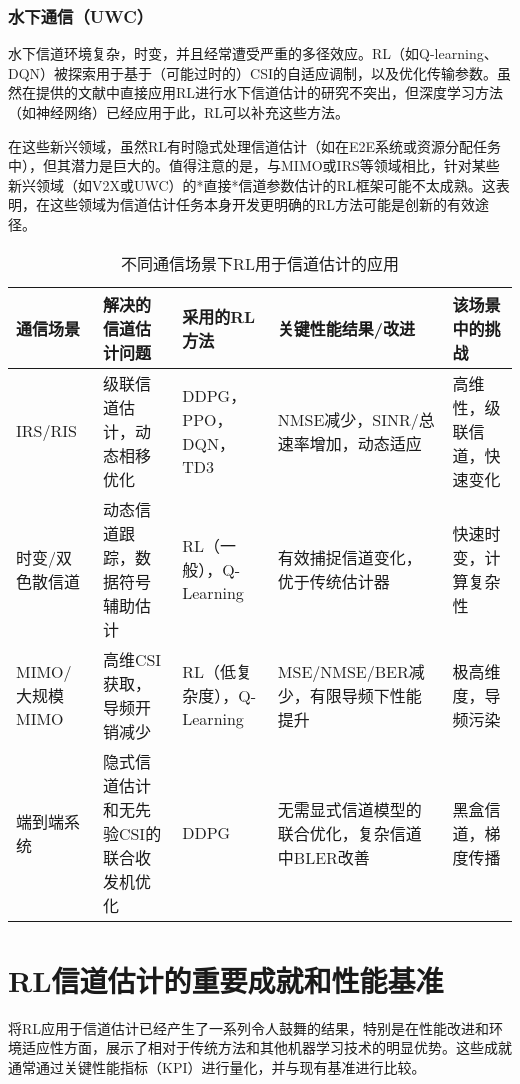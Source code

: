 \documentclass[journal]{IEEEtran}
\begin{document}
\subsubsection{水下通信（UWC）}
水下信道环境复杂，时变，并且经常遭受严重的多径效应。RL（如Q-learning、DQN）被探索用于基于（可能过时的）CSI的自适应调制\cite{ref41}，以及优化传输参数\cite{ref7}。虽然在提供的文献中直接应用RL进行水下信道估计的研究不突出，但深度学习方法（如神经网络）已经应用于此\cite{ref43}，RL可以补充这些方法。

在这些新兴领域，虽然RL有时隐式处理信道估计（如在E2E系统或资源分配任务中），但其潜力是巨大的。值得注意的是，与MIMO或IRS等领域相比，针对某些新兴领域（如V2X或UWC）的*直接*信道参数估计的RL框架可能不太成熟。这表明，在这些领域为信道估计任务本身开发更明确的RL方法可能是创新的有效途径。

\begin{table*}[!t]
\caption{不同通信场景下RL用于信道估计的应用}
\label{tab:table2}
\centering
\begin{tabular}{|p{2.2cm}|p{4cm}|p{3cm}|p{4cm}|p{3cm}|}
\hline
\textbf{通信场景} & \textbf{解决的信道估计问题} & \textbf{采用的RL方法} & \textbf{关键性能结果/改进} & \textbf{该场景中的挑战} \\
\hline
IRS/RIS & 级联信道估计，动态相移优化 & DDPG，PPO，DQN，TD3 & NMSE减少，SINR/总速率增加，动态适应 & 高维性，级联信道，快速变化 \\
\hline
时变/双色散信道 & 动态信道跟踪，数据符号辅助估计 & RL（一般），Q-Learning & 有效捕捉信道变化，优于传统估计器 & 快速时变，计算复杂性 \\
\hline
MIMO/大规模MIMO & 高维CSI获取，导频开销减少 & RL（低复杂度），Q-Learning & MSE/NMSE/BER减少，有限导频下性能提升 & 极高维度，导频污染 \\
\hline
端到端系统 & 隐式信道估计和无先验CSI的联合收发机优化 & DDPG & 无需显式信道模型的联合优化，复杂信道中BLER改善 & 黑盒信道，梯度传播 \\
\hline
\end{tabular}
\end{table*}

\section{RL信道估计的重要成就和性能基准}

将RL应用于信道估计已经产生了一系列令人鼓舞的结果，特别是在性能改进和环境适应性方面，展示了相对于传统方法和其他机器学习技术的明显优势。这些成就通常通过关键性能指标（KPI）进行量化，并与现有基准进行比较。
\end{document}
